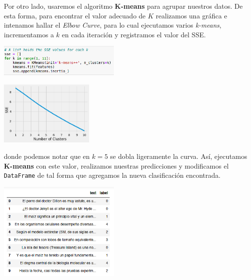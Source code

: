 \documentclass[letterpaper,11pt]{article}
\begin{document}
\begin{enumerate}
    Por otro lado, usaremos el algoritmo \textbf{K-means} para agrupar nuestros 
    datos. De esta forma, para encontrar el valor adecuado de $K$ realizamos una 
    gráfica e intenamos hallar el \textit{Elbow Curve}, para lo cual ejecutamos 
    varios \textit{k-means}, incrementamos a $k$ en cada iteración y registramos 
    el valor del SSE.
    \begin{center}
        \includegraphics[width=0.45\textwidth]{imagenes/text4.png}
    \end{center}
    \newpage
    \begin{center}
        \includegraphics[width=0.35\textwidth]{imagenes/text3.png}
    \end{center}

    donde podemos notar que en $k=5$ se dobla ligeramente la curva. Así, 
    ejecutamos \textbf{K-means} con este valor, realizamos nuestras predicciones 
    y modificamos el \texttt{DataFrame} de tal forma que agregamos la nueva 
    clasificación encontrada.
    \begin{center}
        \includegraphics[width=0.45\textwidth]{imagenes/text5.png}
    \end{center}


\end{enumerate}
\end{document}
